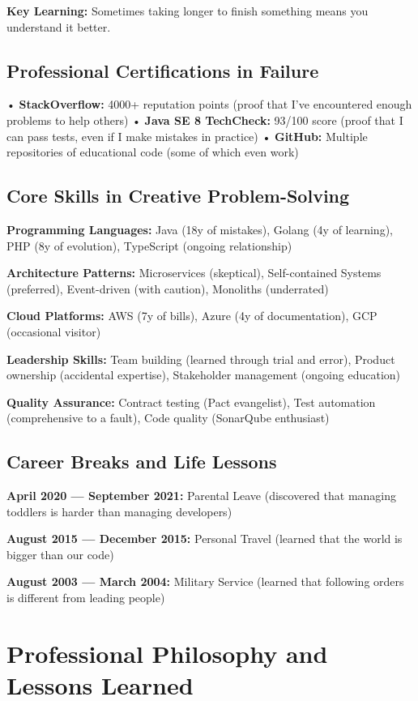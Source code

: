 \documentclass[10pt,a4paper]{article}
\begin{document}
\textbf{Key Learning:} Sometimes taking longer to finish something means you understand it better.

\subsection{Professional Certifications in Failure}
• \textbf{StackOverflow:} 4000+ reputation points (proof that I've encountered enough problems to help others)
• \textbf{Java SE 8 TechCheck:} 93/100 score (proof that I can pass tests, even if I make mistakes in practice)
• \textbf{GitHub:} Multiple repositories of educational code (some of which even work)

\subsection{Core Skills in Creative Problem-Solving}
\textbf{Programming Languages:} Java (18y of mistakes), Golang (4y of learning), PHP (8y of evolution), TypeScript (ongoing relationship)

\textbf{Architecture Patterns:} Microservices (skeptical), Self-contained Systems (preferred), Event-driven (with caution), Monoliths (underrated)

\textbf{Cloud Platforms:} AWS (7y of bills), Azure (4y of documentation), GCP (occasional visitor)

\textbf{Leadership Skills:} Team building (learned through trial and error), Product ownership (accidental expertise), Stakeholder management (ongoing education)

\textbf{Quality Assurance:} Contract testing (Pact evangelist), Test automation (comprehensive to a fault), Code quality (SonarQube enthusiast)

\subsection{Career Breaks and Life Lessons}
\textbf{April 2020 — September 2021:} Parental Leave (discovered that managing toddlers is harder than managing developers)

\textbf{August 2015 — December 2015:} Personal Travel (learned that the world is bigger than our code)

\textbf{August 2003 — March 2004:} Military Service (learned that following orders is different from leading people)

\section{Professional Philosophy and Lessons Learned}
\end{document}
